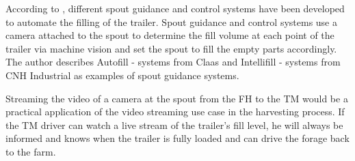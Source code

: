 According to \textcite{murcia_quadrotor_2014}, different spout guidance and control systems have been developed to automate the filling of the trailer. Spout guidance and control systems use a camera attached to the spout to determine the fill volume at each point of the trailer via machine vision and set the spout to fill the empty parts accordingly. The author describes Autofill - systems from Claas and Intellifill - systems from CNH Industrial as examples of spout guidance systems.

Streaming the video of a camera at the spout from the \ac{FH} to the \ac{TM} would be a practical application of the video streaming use case in the harvesting process. If the \ac{TM} driver can watch a live stream of the trailer's fill level, he will always be
informed and knows when the trailer is fully loaded and can drive the forage back to the
farm.

